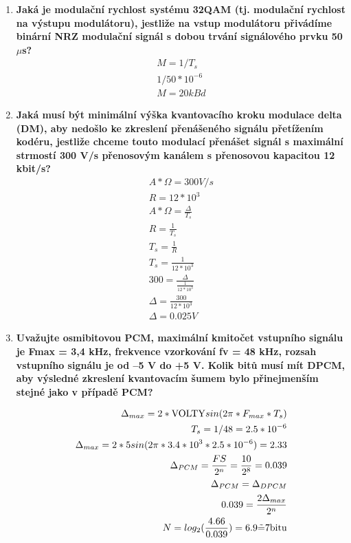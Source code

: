\begin{enumerate}
    \item \textbf{Jaká je modulační rychlost systému 32QAM (tj. modulační rychlost na výstupu modulátoru), 
jestliže na vstup modulátoru přivádíme binární NRZ modulační signál s dobou trvání 
signálového prvku 50 $\mu$s? }
\begin{align*}
    M=1/T_s\\
    1/50*10^{-6} \\
    M=20 kBd
\end{align*}
\item \textbf{Jaká musí být minimální výška kvantovacího kroku modulace delta (DM), aby nedošlo ke 
zkreslení přenášeného signálu přetížením kodéru, jestliže chceme touto modulací přenášet 
signál s maximální strmostí 300 V/s přenosovým kanálem s přenosovou kapacitou 12 kbit/s?}
\begin{align*}
    A*\Omega=300V/s \\
    R=12*10^3 \\
    A*\Omega=\frac{\Delta}{T_s}\\
    R=\frac{1}{T_s} \\
    T_s=\frac{1}{R} \\
    T_s=\frac{1}{12*10^3} \\
    300=\frac{\Delta}{\frac{1}{12*10^3}}\\
    \Delta=\frac{300}{12*10^3}\\
    \Delta=0.025 V
\end{align*}
\item \textbf{Uvažujte osmibitovou PCM, maximální kmitočet vstupního signálu je Fmax = 3,4 kHz, 
frekvence vzorkování fv = 48 kHz, rozsah vstupního signálu je od –5 V do +5 V. Kolik bitů musí 
mít DPCM, aby výsledné zkreslení kvantovacím šumem bylo přinejmenším stejné jako 
v případě PCM?}

\begin{align*}
\Delta_{max}=2*\mathrm{VOLTY}sin(2\pi*F_{max}*T_s) \\
T_s=1/48=2.5*10^{-6} \\
    \Delta_{max}=2*5sin(2\pi*3.4*10^3*2.5*10^{-6})=2.33\\
      \Delta_{PCM}=\frac{FS}{2^n}=\frac{10}{2^8}=0.039 \\
    \Delta_{PCM}=\Delta_{DPCM} \\
    0.039=\frac{2\Delta_{max}}{2^n}\\
   N=log_2(\frac{4.66}{0.039})=6.9\Tilde{=}7\mathrm{bitu}
\end{align*}

\end{enumerate}

